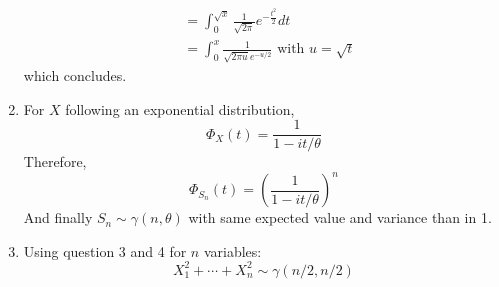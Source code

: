 \begin{solution}
\begin{enumerate}
\begin{align*}
                               & = \int_0^{\sqrt{x}} \frac{1}{\sqrt{2\pi}} e^{-\frac{t^2}{2}} dt           \\
                               & = \int_0^{x} \frac{1}{\sqrt{2 \pi u} e^{-u/2}} \text{ with } u = \sqrt{t}
          \end{align*}
          which concludes.
    \item For $X$ following an exponential distribution,
          \[
            \Phi_X(t) = \frac{1}{1 - it/\theta}
          \]
          Therefore,
          \[
            \Phi_{S_n}(t) = {\left( \frac{1}{1 - it/\theta} \right)}^n
          \]
          And finally $S_n \sim \gamma(n, \theta)$ with same expected value and variance than in 1.
    \item Using question 3 and 4 for $n$ variables:
          $$ X_1^2 + \cdots + X_n^2 \sim \gamma(n/2, n/2) $$

  \end{enumerate}
\end{solution}